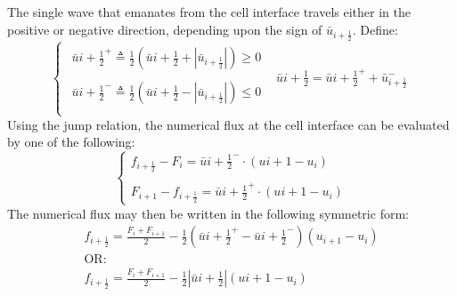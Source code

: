 \documentclass[11pt, a4paper]{article}
\begin{document}
The single wave that emanates from the cell interface travels either in the positive or negative direction, depending upon the sign of $\bar{u}_{i+\frac{1}{2}}$. Define:
\begin{equation}
    \left\{\begin{array}{cc}
        \begin{array}{c}
            \bar{u}{i+\frac{1}{2}}^+\triangleq\displaystyle\frac{1}{2}\left(\bar{u}{i+\frac{1}{2}}+\left|\bar{u}_{i+\frac{1}{2}}\right|\right)\geq0 \\\\
            \bar{u}{i+\frac{1}{2}}^-\triangleq\displaystyle\frac{1}{2}\left(\bar{u}{i+\frac{1}{2}}-\left|\bar{u}_{i+\frac{1}{2}}\right|\right)\leq0 \\
        \end{array} & \bar{u}{i+\frac{1}{2}}=\bar{u}{i+\frac{1}{2}}^++\bar{u}_{i+\frac{1}{2}}^-
    \end{array}\right.
\end{equation}
Using the jump relation, the numerical flux at the cell interface can be evaluated by one of the following:
\begin{equation}
    \left\{\begin{array}{l}
        f_{i+\frac{1}{2}}-F_i = \bar{u}{i+\frac{1}{2}}^-\cdot\left(u{i+1}-u_i\right) \\\\
        F_{i+1}-f_{i+\frac{1}{2}}=\bar{u}{i+\frac{1}{2}}^+\cdot\left(u{i+1}-u_i\right)
    \end{array}\right.
\end{equation}
The numerical flux may then be written in the following symmetric form:
\begin{equation}
    \begin{array}{l}
        \displaystyle f_{i+\frac{1}{2}}=\frac{F_i+F_{i+1}}{2}-\frac{1}{2}\left(\bar{u}{i+\frac{1}{2}}^+-\bar{u}{i+\frac{1}{2}}^-\right)\left(u_{i+1}-u_i\right) \\
        \mathrm{OR:} \\
        \displaystyle f_{i+\frac{1}{2}}=\frac{F_i+F_{i+1}}{2}-\frac{1}{2}\left|\bar{u}{i+\frac{1}{2}}\right|\left(u{i+1}-u_i\right)
    \end{array}
\end{equation}
\end{document}
